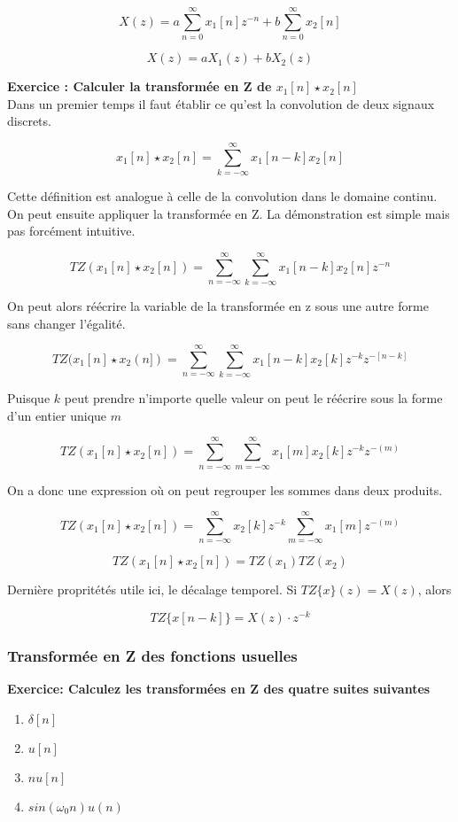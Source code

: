\documentclass[11pt,a4paper]{article}
\begin{document}
\[X(z) = a \sum_{n = 0}^{\infty} x_1[n]  z^{-n} + b \sum_{n = 0}^{\infty} x_2[n] \] 

\[X(z) = a X_1(z)+ b X_2(z) \] 

\textbf{Exercice : Calculer la transformée en Z de $x_1[n] \star x_2[n]$}\\

Dans un premier temps il faut établir ce qu'est la convolution  de deux signaux discrets.

\[ x_1[n] \star x_2[n]=  \sum_{k = -\infty}^{\infty} x_1[n-k]x_2[n] \]

Cette définition est analogue à celle de la convolution dans le domaine continu. On peut ensuite appliquer la transformée en Z. La démonstration est simple mais pas forcément intuitive.

\[ TZ(x_1[n] \star x_2[n]) = \sum_{n = -\infty}^{\infty} \sum_{k = -\infty}^{\infty} x_1[n-k]x_2[n] z^{-n}\]

On peut alors réécrire la variable de la transformée en z sous une autre forme sans changer l'égalité.

\[ TZ(x_1[n] \star x_2(n]) = \sum_{n = -\infty}^{\infty} \sum_{k = -\infty}^{\infty} x_1[n-k]x_2[k] z^{-k}  z^{-[n-k]}\]

Puisque $k$ peut prendre n'importe quelle valeur on peut le réécrire sous la forme d'un entier unique $m$ 

\[ TZ(x_1[n] \star x_2[n]) = \sum_{n = -\infty}^{\infty} \sum_{m = -\infty}^{\infty} x_1[m]x_2[k] z^{-k}  z^{-(m)}\]

On a donc une expression où on peut regrouper les sommes dans deux produits.

\[ TZ(x_1[n] \star x_2[n]) = \sum_{n = -\infty}^{\infty} x_2[k]z^{-k} \sum_{m = -\infty}^{\infty} x_1[m]   z^{-(m)}\]

\[ TZ(x_1[n] \star x_2[n]) = TZ(x_1) TZ(x_2)\]

Dernière propritétés utile ici, le décalage temporel. Si $TZ\{x \}(z) = X(z)$, alors 

\[ TZ\{x[n-k]\} = X(z)\cdot z^{-k} \]

\subsubsection{Transformée en Z des fonctions usuelles}

\textbf{Exercice: Calculez les transformées en Z des quatre suites suivantes}
\begin{enumerate}
\item $\delta[n]$
\item $u[n]$
\item $nu[n]$
\item $sin(\omega_0 n)u(n)$
\end{enumerate} 
\end{document}
